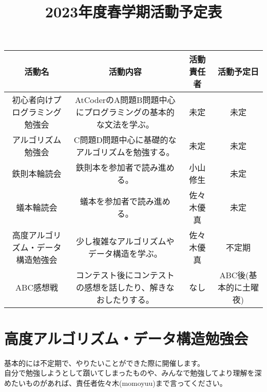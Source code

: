 \documentclass[a4paper, landscape]{jsarticle}
\title{2023年度春学期活動予定表}
\date{}
\begin{document}
\maketitle


\begin{table}[htbp]
  \centering
  \begin{tabular}{c|c|c|c}
    \hline
      活動名 & 活動内容 & 活動責任者 & 活動予定日 \\
    \hline \hline
      初心者向けプログラミング勉強会 & 
      AtCoderのA問題B問題中心にプログラミングの基本的な文法を学ぶ。 &
      未定 &
      未定 \\
    \hline
      アルゴリズム勉強会 &
      C問題D問題中心に基礎的なアルゴリズムを勉強する。 &
      未定 &
      未定 \\
    \hline
     鉄則本輪読会 &
     鉄則本を参加者で読み進める。 &
     小山修生 &
     未定 \\
    \hline
     蟻本輪読会 &
     蟻本を参加者で読み進める。 &
     佐々木優真 &
     未定 \\
    \hline \hline
     高度アルゴリズム・データ構造勉強会 &
     少し複雑なアルゴリズムやデータ構造を学ぶ。 &
     佐々木優真 &
     不定期 \\
     \hline
     ABC感想戦 &
     コンテスト後にコンテストの感想を話したり、解きなおしたりする。 &
     なし &
     ABC後(基本的に土曜夜)\\
     \hline
  \end{tabular}
\end{table}

\section{高度アルゴリズム・データ構造勉強会}
基本的には不定期で、やりたいことができた際に開催します。\\
自分で勉強しようとして躓いてしまったものや、みんなで勉強してより理解を深めたいものがあれば、責任者佐々木(momoyuu)まで言ってください。
\end{document}
